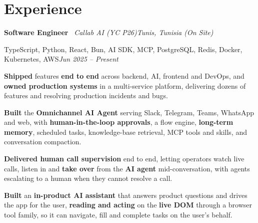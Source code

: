 \section{Experience}

\begin{onecolentry}
    \textbf{Software Engineer} \textbar\ \textit{Callab AI (YC P26)}\hfill\textit{Tunis, Tunisia (On Site)}

    {\footnotesize TypeScript, Python, React, Bun, AI SDK, MCP, PostgreSQL, Redis, Docker, Kubernetes, AWS}\hfill\textit{Jun 2025 – Present}%
\end{onecolentry}
\vspace{0.03 cm}
\begin{onecolentry}
    \begin{highlights}
        \item \textbf{Shipped} features \textbf{end to end} across backend, AI, frontend and DevOps, and \textbf{owned production systems} in a multi-service platform, delivering dozens of features and resolving production incidents and bugs.
        \item \textbf{Built} the \textbf{Omnichannel AI Agent} serving Slack, Telegram, Teams, WhatsApp and web, with \textbf{human-in-the-loop approvals}, a flow engine, \textbf{long-term memory}, scheduled tasks, knowledge-base retrieval, MCP tools and skills, and conversation compaction.
        \item \textbf{Delivered human call supervision} end to end, letting operators watch live calls, listen in and \textbf{take over} from the \textbf{AI agent} mid-conversation, with agents escalating to a human when they cannot resolve a call.
        \item \textbf{Built} an \textbf{in-product AI assistant} that answers product questions and drives the app for the user, \textbf{reading and acting} on the \textbf{live DOM} through a browser tool family, so it can navigate, fill and complete tasks on the user's behalf.
    \end{highlights}
\end{onecolentry}
\entrygap

